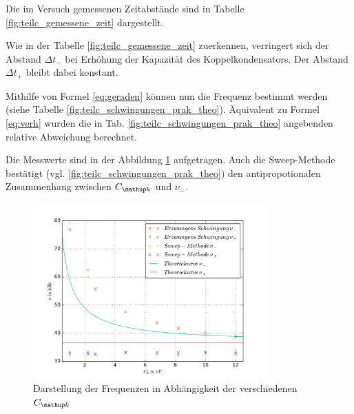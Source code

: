 Die im Versuch gemessenen Zeitabstände sind in Tabelle \ref{fig:teilc_gemessene_zeit} dargestellt.


Wie in der Tabelle \ref{fig:teilc_gemessene_zeit} zuerkennen, verringert sich der Abstand $\Delta t_-$ bei
Erhöhung der Kapazität des Koppelkondensators. Der Abstand $\Delta t_+$ bleibt dabei konstant.

Mithilfe von Formel \eqref{eq:geraden} können nun die Frequenz bestimmt werden (siehe Tabelle \ref{fig:teilc_schwingungen_prak_theo}).
Äquivalent zu Formel \eqref{eq:verh} wurden die in Tab. \ref{fig:teilc_schwingungen_prak_theo} angebenden relative Abweichung berechnet.

Die Messwerte sind in der Abbildung \ref{fig: plot} aufgetragen.
Auch die Sweep-Methode bestätigt (vgl. \ref{fig:teilc_schwingungen_prak_theo}) den antipropotionalen
Zusammenhang zwischen $C\ua{k}$ und $\nu_-$. %
\begin{figure}
  \centering
  \includegraphics[width=0.8\textwidth]{pics/plot_frequenzen.pdf}
  \caption{Darstellung der Frequenzen in Abhängigkeit der verschiedenen $C\ua{k}$}
  \label{fig: plot}
\end{figure}
